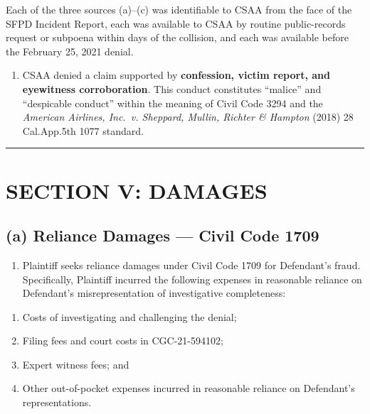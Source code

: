 Each of the three sources (a)--(c) was identifiable to CSAA from the face of the SFPD Incident Report, each was available to CSAA by routine public-records request or subpoena within days of the collision, and each was available before the February 25, 2021 denial.

\begin{enumerate}
\def\labelenumi{\arabic{enumi}.}
\setcounter{enumi}{29}
\tightlist
\item
  CSAA denied a claim supported by \textbf{confession, victim report, and eyewitness corroboration}. This conduct constitutes ``malice'' and ``despicable conduct'' within the meaning of Civil Code \textsection{} 3294 and the \emph{American Airlines, Inc.~v. Sheppard, Mullin, Richter \& Hampton} (2018) 28 Cal.App.5th 1077 standard.
\end{enumerate}

\begin{center}\rule{0.5\linewidth}{0.5pt}\end{center}

\label{toc:section-v-damages}
\section{SECTION V: DAMAGES}\label{section-v-damages}

\subsection{(a) Reliance Damages --- Civil Code \textsection{} 1709}\label{a-reliance-damages-civil-code-1709}

\begin{enumerate}
\def\labelenumi{\arabic{enumi}.}
\setcounter{enumi}{30}
\tightlist
\item
  Plaintiff seeks reliance damages under Civil Code \textsection{} 1709 for Defendant's fraud. Specifically, Plaintiff incurred the following expenses in reasonable reliance on Defendant's misrepresentation of investigative completeness:
\end{enumerate}

\begin{enumerate}
\def\labelenumi{(\roman{enumi})}
\tightlist
\item
  Costs of investigating and challenging the denial;
\item
  Filing fees and court costs in CGC-21-594102;
\item
  Expert witness fees; and
\item
  Other out-of-pocket expenses incurred in reasonable reliance on Defendant's representations.
\end{enumerate}

